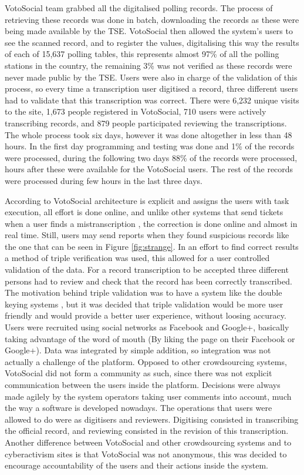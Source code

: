 \documentclass[letterpaper,10pt]{article}
\begin{document}
VotoSocial team grabbed all the digitalised polling records. The process of retrieving these records was done in batch, downloading the records as these were being made available by the TSE. VotoSocial then allowed the system's users to see the scanned record, and to register the values, digitalising this way the results of each of 15,637 polling tables, this represents almost 97\% of all the polling stations in the country, the remaining 3\% was not verified as these records were never made public by the TSE. Users were also in charge of the validation of this process, so every time a transcription user digitised a record, three different users had to validate that this transcription was correct. There were 6,232 unique visits to the site, 1,673 people registered in VotoSocial, 710 users were actively transcribing records, and 879 people participated reviewing the transcriptions. The whole process took six days, however it was done altogether in less than 48 hours. In the first day programming and testing was done and 1\% of the records were processed, during the following two days 88\% of the records were processed, hours after these were available for the VotoSocial users. The rest of the records were processed during few hours in the last three days.

According to \cite{doan2011} VotoSocial architecture is explicit and assigns the users with task execution, all effort is done online, and unlike other systems that send tickets when a user finds a mistranscription \citep{haaf2013}, the correction is done online and almost in real time. Still, users may send reports when they found suspicious records like the one that can be seen in Figure \ref{fig:strange}. In an effort to find correct results a method of triple verification was used, this allowed for a user controlled validation of the data. For a record transcription to be accepted three different persons had to review and check that the record has been correctly transcribed. The motivation behind triple validation was to have a system like the double keying systems \citep{haaf2013}, but it was decided that triple validation would be more user friendly and would provide a better user experience, without loosing accuracy. Users were recruited using social networks as Facebook and Google+, basically taking advantage of the word of mouth (By liking the page on their Facebook or Google+). Data was integrated by simple addition, so integration was not actually a challenge of the platform. Opposed to other crowdsourcing systems, VotoSocial did not form a community as such, since there was not explicit communication between the users inside the platform. Decisions were always made agilely by the system operators taking user comments into account, much the way a software is developed nowadays. The operations that users were allowed to do were as digitisers and reviewers. Digitising consisted in transcribing the official record, and reviewing consisted in the revision of this transcription. Another difference between VotoSocial and other crowdsourcing systems and to cyberactivism sites is that VotoSocial was not anonymous, this was decided to encourage accountability of the users and their actions inside the system. 
\end{document}
